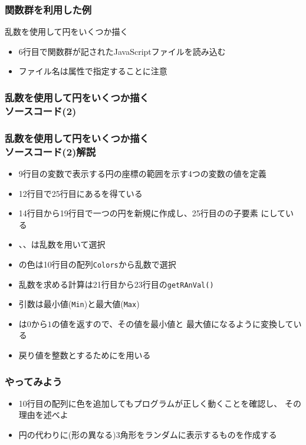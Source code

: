 \begin{frame}[containsverbatim]
 \frametitle{関数群を利用した例}
 乱数を使用して円をいくつか描く
 \begin{itemize}
  \item 6行目で関数群が記されたJavaScriptファイルを読み込む
  \item ファイル名は属性で指定することに注意
 \end{itemize}
\end{frame}
  \begin{frame}[containsverbatim]
   \frametitle{乱数を使用して円をいくつか描く\\ソースコード(2)}
 \end{frame}
  \begin{frame}[containsverbatim]
   \frametitle{乱数を使用して円をいくつか描く\\ソースコード(2)解説}
\begin{itemize}
 \item 9行目の変数で表示する円の座標の範囲を示す4つの変数の値を定義
 \item 12行目で25行目にあるを得ている
 \item 14行目から19行目で一つの円を新規に作成し、25行目のの子要素
       にしている
 \item {}、、は乱数を用いて選択
 \item {}の色は10行目の配列\texttt{Colors}から乱数で選択
 \item 乱数を求める計算は21行目から23行目の\texttt{getRAnVal()}
 \item 引数は最小値(\texttt{Min})と最大値(\texttt{Max})
 \item {}は$0$から$1$の値を返すので、その値を最小値と
       最大値になるように変換している
 \item 戻り値を整数とするためにを用いる
\end{itemize}
  \end{frame}
\begin{frame}[containsverbatim]
 \frametitle{やってみよう}
 \begin{itemize}
  \item 10行目の配列に色を追加してもプログラムが正しく動くことを確認し、
        その理由を述べよ
  \item 円の代わりに(形の異なる)3角形をランダムに表示するものを作成する
 \end{itemize}
\end{frame}

\begin{frame}[containsverbatim]
 \frametitle{}
\end{frame}
